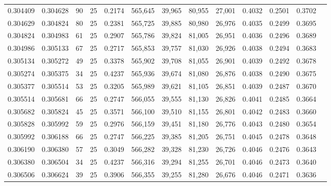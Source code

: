 \begin{tabular}{rrrrrrrrrrrrr}
0.304409 & 0.304628 &    90 &  25 &                                     0.2174 & 565,645 &  39,965 &  80,955 &  27,001 & 0.4032 & 0.2501 & 0.3702 \\
0.304629 & 0.304824 &    80 &  25 &                                     0.2381 & 565,725 &  39,885 &  80,980 &  26,976 & 0.4035 & 0.2499 & 0.3695 \\
0.304824 & 0.304983 &    61 &  25 &                                     0.2907 & 565,786 &  39,824 &  81,005 &  26,951 & 0.4036 & 0.2496 & 0.3689 \\
0.304986 & 0.305133 &    67 &  25 &                                     0.2717 & 565,853 &  39,757 &  81,030 &  26,926 & 0.4038 & 0.2494 & 0.3683 \\
0.305134 & 0.305272 &    49 &  25 &                                     0.3378 & 565,902 &  39,708 &  81,055 &  26,901 & 0.4039 & 0.2492 & 0.3678 \\
0.305274 & 0.305375 &    34 &  25 &                                     0.4237 & 565,936 &  39,674 &  81,080 &  26,876 & 0.4038 & 0.2490 & 0.3675 \\
0.305377 & 0.305514 &    53 &  25 &                                     0.3205 & 565,989 &  39,621 &  81,105 &  26,851 & 0.4039 & 0.2487 & 0.3670 \\
0.305514 & 0.305681 &    66 &  25 &                                     0.2747 & 566,055 &  39,555 &  81,130 &  26,826 & 0.4041 & 0.2485 & 0.3664 \\
0.305682 & 0.305824 &    45 &  25 &                                     0.3571 & 566,100 &  39,510 &  81,155 &  26,801 & 0.4042 & 0.2483 & 0.3660 \\
0.305828 & 0.305992 &    59 &  25 &                                     0.2976 & 566,159 &  39,451 &  81,180 &  26,776 & 0.4043 & 0.2480 & 0.3654 \\
0.305992 & 0.306188 &    66 &  25 &                                     0.2747 & 566,225 &  39,385 &  81,205 &  26,751 & 0.4045 & 0.2478 & 0.3648 \\
0.306190 & 0.306380 &    57 &  25 &                                     0.3049 & 566,282 &  39,328 &  81,230 &  26,726 & 0.4046 & 0.2476 & 0.3643 \\
0.306380 & 0.306504 &    34 &  25 &                                     0.4237 & 566,316 &  39,294 &  81,255 &  26,701 & 0.4046 & 0.2473 & 0.3640 \\
0.306506 & 0.306624 &    39 &  25 &                                     0.3906 & 566,355 &  39,255 &  81,280 &  26,676 & 0.4046 & 0.2471 & 0.3636 \\

\end{tabular}
